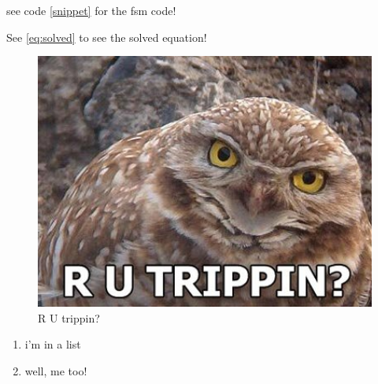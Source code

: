 \documentclass[11pt,a4paper]{report}
\begin{document}
		see code \ref{snippet} for the fsm code!

		See \ref{eq:solved} to see the solved equation!

		\begin{figure}[\htbp]
			\includegraphics[width=1.0\textwidth]{rutrippin}
		  \caption{R U trippin?}
		  \label{trippin}
		\end{figure}


		\begin{enumerate}
		\item i'm in a list
		\item well, me too!
		\end{enumerate}

		
\end{document}
